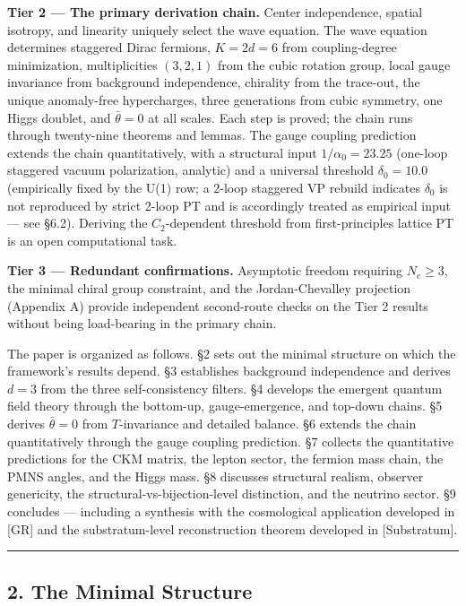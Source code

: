 \documentclass[
]{article}
\begin{document}
\textbf{Tier 2 --- The primary derivation chain.} Center independence,
spatial isotropy, and linearity uniquely select the wave equation. The
wave equation determines staggered Dirac fermions, \(K = 2d = 6\) from
coupling-degree minimization, multiplicities \((3, 2, 1)\) from the
cubic rotation group, local gauge invariance from background
independence, chirality from the trace-out, the unique anomaly-free
hypercharges, three generations from cubic symmetry, one Higgs doublet,
and \(\bar\theta = 0\) at all scales. Each step is proved; the chain
runs through twenty-nine theorems and lemmas. The gauge coupling
prediction extends the chain quantitatively, with a structural input
\(1/\alpha_0 = 23.25\) (one-loop staggered vacuum polarization,
analytic) and a universal threshold \(\delta_0 = 10.0\) (empirically
fixed by the U(1) row; a 2-loop staggered VP rebuild indicates
\(\delta_0\) is not reproduced by strict 2-loop PT and is accordingly
treated as empirical input --- see §6.2). Deriving the \(C_2\)-dependent
threshold from first-principles lattice PT is an open computational
task.

\textbf{Tier 3 --- Redundant confirmations.} Asymptotic freedom
requiring \(N_c \geq 3\), the minimal chiral group constraint, and the
Jordan-Chevalley projection (Appendix A) provide independent
second-route checks on the Tier 2 results without being load-bearing in
the primary chain.

The paper is organized as follows. §2 sets out the minimal structure on
which the framework's results depend. §3 establishes background
independence and derives \(d = 3\) from the three self-consistency
filters. §4 develops the emergent quantum field theory through the
bottom-up, gauge-emergence, and top-down chains. §5 derives
\(\bar\theta = 0\) from \(T\)-invariance and detailed balance. §6
extends the chain quantitatively through the gauge coupling prediction.
§7 collects the quantitative predictions for the CKM matrix, the lepton
sector, the fermion mass chain, the PMNS angles, and the Higgs mass. §8
discusses structural realism, observer genericity, the
structural-vs-bijection-level distinction, and the neutrino sector. §9
concludes --- including a synthesis with the cosmological application
developed in {[}GR{]} and the substratum-level reconstruction theorem
developed in {[}Substratum{]}.

\begin{center}\rule{0.5\linewidth}{0.5pt}\end{center}

\hypertarget{the-minimal-structure}{%
\subsection{2. The Minimal Structure}\label{the-minimal-structure}}
\end{document}
